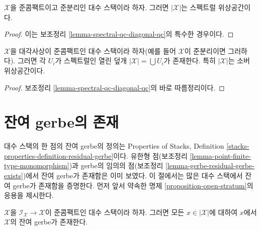 \begin{lemma}
\label{lemma-spectral-qcqs}
$\mathcal{X}$을 준콤팩트이고 준분리인 대수 스택이라 하자. 그러면
$|\mathcal{X}|$는 스펙트럴 위상공간이다.
\end{lemma}

\begin{proof}
이는 보조정리 \ref{lemma-spectral-qc-diagonal-qc}의 특수한 경우이다.
\end{proof}

\begin{lemma}
\label{lemma-sober-qs}
$\mathcal{X}$을 대각사상이 준콤팩트인 대수 스택이라 하자(예를 들어
$\mathcal{X}$이 준분리이면 그러하다). 그러면 각 $U_i$가 스펙트럴인
열린 덮개 $|\mathcal{X}| = \bigcup U_i$가 존재한다. 특히
$|\mathcal{X}|$는 소버 위상공간이다.
\end{lemma}

\begin{proof}
보조정리 \ref{lemma-spectral-qc-diagonal-qc}의 바로 따름정리이다.
\end{proof}






\section{잔여 gerbe의 존재}
\label{section-existence-residual-gerbes}

\noindent
대수 스택의 한 점의 잔여 gerbe의 정의는 Properties of Stacks,
Definition \ref{stacks-properties-definition-residual-gerbe}이다. 유한형
점(보조정리 \ref{lemma-point-finite-type-monomorphism})과 gerbe의 임의의
점(보조정리 \ref{lemma-gerbe-residual-gerbe-exists})에서 잔여 gerbe가
존재함은 이미 보였다. 이 절에서는 많은 대수 스택에서 잔여 gerbe가
존재함을 증명한다. 먼저 앞서 약속한 명제
\ref{proposition-open-stratum}의 응용을 제시한다.

\begin{lemma}
\label{lemma-every-point-residual-gerbe}
$\mathcal{X}$을 $\mathcal{I}_\mathcal{X} \to \mathcal{X}$이 준콤팩트인
대수 스택이라 하자. 그러면 모든 $x \in |\mathcal{X}|$에 대하여
$x$에서 $\mathcal{X}$의 잔여 gerbe가 존재한다.
\end{lemma}

